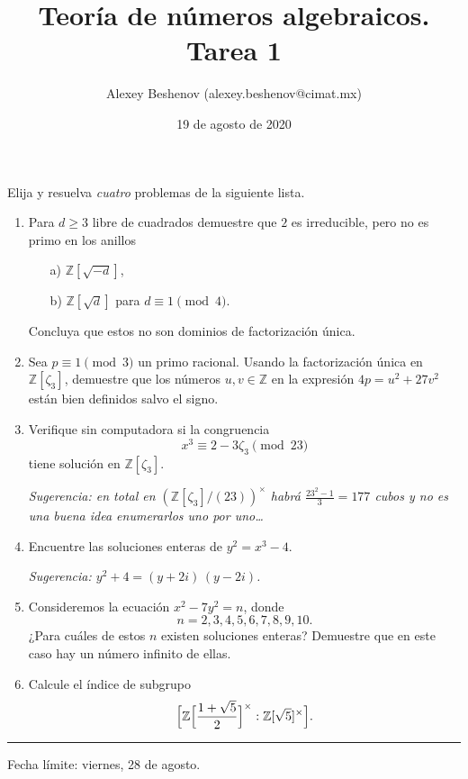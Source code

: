 \documentclass{article}
\title{Teoría de números algebraicos. Tarea 1}
\author{Alexey Beshenov (alexey.beshenov@cimat.mx)}
\date{19 de agosto de 2020}
\begin{document}
\maketitle

\thispagestyle{empty}

\noindent Elija y resuelva \emph{cuatro} problemas de la siguiente lista.

\begin{enumerate}
\item Para $d \ge 3$ libre de cuadrados demuestre que $2$ es irreducible,
  pero no es primo en los anillos
  \begin{enumerate}
  \item[a)] $\mathbb{Z} [\sqrt{-d}]$,
  \item[b)] $\mathbb{Z} [\sqrt{d}]$ para $d \equiv 1 \pmod{4}$.
  \end{enumerate}

  Concluya que estos no son dominios de factorización única.

\item Sea $p \equiv 1 \pmod{3}$ un primo racional. Usando la factorización única
  en $\mathbb{Z} [\zeta_3]$, demuestre que los números $u,v \in \mathbb{Z}$ en
  la expresión $4p = u^2 + 27 v^2$ están bien definidos salvo el signo.

\item Verifique sin computadora si la congruencia
  $$x^3 \equiv 2 - 3\zeta_3 \pmod{23}$$
  tiene solución en $\mathbb{Z} [\zeta_3]$.

  \emph{Sugerencia: en total en $(\mathbb{Z} [\zeta_3]/(23))^\times$ habrá
    $\frac{23^2 - 1}{3} = 177$ cubos y no es una buena idea enumerarlos uno por
    uno\dots}

\item Encuentre las soluciones enteras de $y^2 = x^3 - 4$.

  \emph{Sugerencia: $y^2 + 4 = (y + 2i)\,(y - 2i)$.}

\item Consideremos la ecuación $x^2 - 7y^2 = n$, donde
  $$n = 2,3,4,5,6,7,8,9,10.$$
  ¿Para cuáles de estos $n$ existen soluciones enteras?
  Demuestre que en este caso hay un número infinito de ellas.

\item Calcule el índice de subgrupo
  \[ \Bigl[ \mathbb{Z} \Bigl[\frac{1+\sqrt{5}}{2}\Bigr]^\times :
            \mathbb{Z} [\sqrt{5}]^\times \Bigr]. \]
\end{enumerate}

\noindent\rule{50pt}{1pt}

\noindent Fecha límite: viernes, 28 de agosto.
\end{document}
